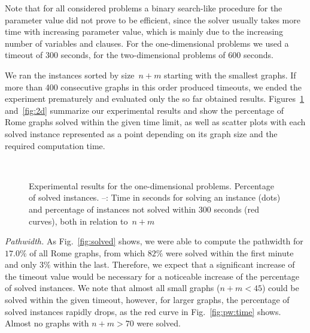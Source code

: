 \documentclass[runningheads]{llncs}
\begin{document}
Note that for all considered
problems a binary search-like procedure for the parameter value did not prove to be efficient, since the solver usually takes more time with increasing parameter value, which is mainly due to the increasing number of variables and
clauses.
For the one-dimensional problems we used a timeout of 300 seconds, for the two-dimensional problems of 600 seconds. 

We ran the instances sorted by size~$n+m$ starting with the smallest
graphs. If more than 400 consecutive graphs in this order produced
timeouts, we ended the experiment prematurely and evaluated only the
so far obtained results. Figures~\ref{fig:1d} and~\ref{fig:2d}
summarize our experimental results and show the percentage of Rome
graphs solved within the given time limit, as well as scatter plots
with each solved instance represented as a point depending on its
graph size and the required computation time. 

\begin{figure}[t]
 \hfill
 \\
 \hfill
 \caption{\small
  Experimental results for the one-dimensional problems.
  \protect{} Percentage of solved instances.
  \protect{}--\protect{}: 
  Time in seconds for solving an instance (dots)
  and percentage of instances not solved within 300 seconds (red curves), 
  both in relation to~$n+m$ 
}\label{fig:1d}
	\vspace{-2ex}
\end{figure}

\smallskip\noindent\textit{Pathwidth.}
As Fig.~\ref{fig:solved} shows,
we were able to compute the pathwidth for $17.0\%$ of all Rome graphs,
from which $82\%$ were solved within the first minute
and only $3\%$ within the last.
Therefore, we expect that a significant increase of the timeout value
would be necessary for a noticeable increase 
of the percentage of solved instances.
We note that almost all small graphs ($n+m<45$)
could be solved within the given timeout,
however, for larger graphs, the percentage of solved instances rapidly drops,
as the red curve in Fig.~\ref{fig:pw:time} shows.
Almost no graphs with $n+m>70$ were solved.
\end{document}
